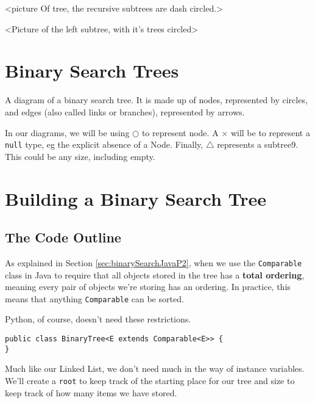 <picture Of tree, the recursive subtrees are dash circled.>

<Picture of the left subtree, with it's trees circled>




















\section{Binary Search Trees}

A diagram of a binary search tree.  It is made up of nodes, represented by circles, and edges (also called links or branches), represented by arrows.  


In our diagrams, we will be using $\bigcirc$ to represent node. A $\times$ will be to represent a \texttt{null} type, eg the explicit absence of a Node.  Finally, $\bigtriangleup$ represents a subtree9.  This could be any size, including empty.


\section{Building a Binary Search Tree}

\subsection{The Code Outline}


As explained in Section \ref{sec:binarySearchJavaP2}, when we use the \texttt{Comparable} class in Java to require that all objects stored in the tree has a \textbf{total ordering}, meaning every pair of objects we're storing has an ordering.
In practice, this means that anything \texttt{Comparable} can be sorted.

Python, of course, doesn't need these restrictions.
\begin{verbatim}
public class BinaryTree<E extends Comparable<E>> {
}
\end{verbatim}




Much like our Linked List, we don't need much in the way of instance variables.  We'll create a \texttt{root} to keep track of the starting place for our tree and size to keep track of how many items we have stored.

